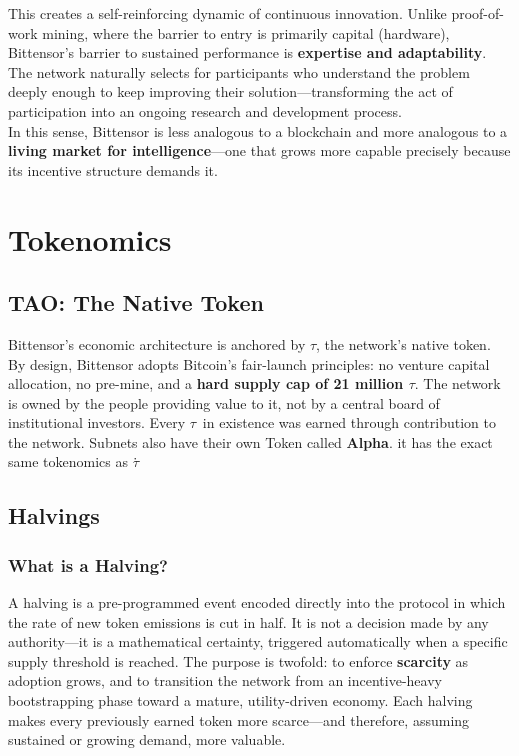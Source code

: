 \documentclass[12pt, a4paper, oneside]{report}
\newcommand{\TAO}{$\tau$}            %
\theoremstyle{definition}
\begin{document}
This creates a self-reinforcing dynamic of continuous innovation. Unlike proof-of-work 
mining, where the barrier to entry is primarily capital (hardware), Bittensor's 
barrier to sustained performance is \textbf{expertise and adaptability}. The network 
naturally selects for participants who understand the problem deeply enough to keep 
improving their solution—transforming the act of participation into an ongoing 
research and development process.\\[0.4cm]

In this sense, Bittensor is less analogous to a blockchain and more analogous to a 
\textbf{living market for intelligence}—one that grows more capable precisely because 
its incentive structure demands it.







\section{Tokenomics}
\label{sec:tokenomics}

\subsection{TAO: The Native Token}

Bittensor's economic architecture is anchored by \textbf{\TAO}, the network's native 
token. By design, Bittensor adopts Bitcoin's fair-launch principles: no venture capital 
allocation, no pre-mine, and a \textbf{hard supply cap of 21 million \TAO}. The network is owned by the people 
providing value to it, not by a central board of institutional 
investors. Every \TAO\ in existence was earned through contribution to the network. Subnets also have their own Token called \textbf{Alpha}. it has the exact same tokenomics as \TAO\.

\subsection{Halvings}



\subsubsection*{What is a Halving?}

A halving is a pre-programmed event encoded directly into the protocol in which the 
rate of new token emissions is cut in half. It is not a decision made by any 
authority—it is a mathematical certainty, triggered automatically when a specific 
supply threshold is reached. The purpose is twofold: to enforce \textbf{scarcity} 
as adoption grows, and to transition the network from an incentive-heavy bootstrapping 
phase toward a mature, utility-driven economy. Each halving makes every previously 
earned token more scarce—and therefore, assuming sustained or growing demand, 
more valuable.
\end{document}
